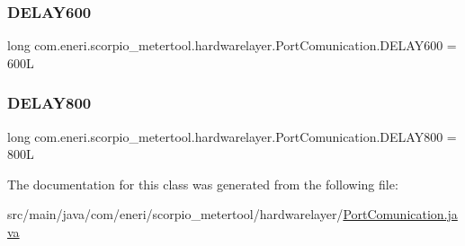 \subsubsection{\texorpdfstring{D\+E\+L\+A\+Y600}{DELAY600}}
{\footnotesize\ttfamily long com.\+eneri.\+scorpio\+\_\+metertool.\+hardwarelayer.\+Port\+Comunication.\+D\+E\+L\+A\+Y600 = 600L\hspace{0.3cm}{\ttfamily [static]}}

\mbox{\label{classcom_1_1eneri_1_1scorpio__metertool_1_1hardwarelayer_1_1_port_comunication_acc8b5901450eaf3703a02c7b7e8bc203}} 
\subsubsection{\texorpdfstring{D\+E\+L\+A\+Y800}{DELAY800}}
{\footnotesize\ttfamily long com.\+eneri.\+scorpio\+\_\+metertool.\+hardwarelayer.\+Port\+Comunication.\+D\+E\+L\+A\+Y800 = 800L\hspace{0.3cm}{\ttfamily [static]}}



The documentation for this class was generated from the following file\+:\begin{DoxyCompactItemize}
\item 
src/main/java/com/eneri/scorpio\+\_\+metertool/hardwarelayer/\hyperlink{_port_comunication_8java}{Port\+Comunication.\+java}\end{DoxyCompactItemize}
